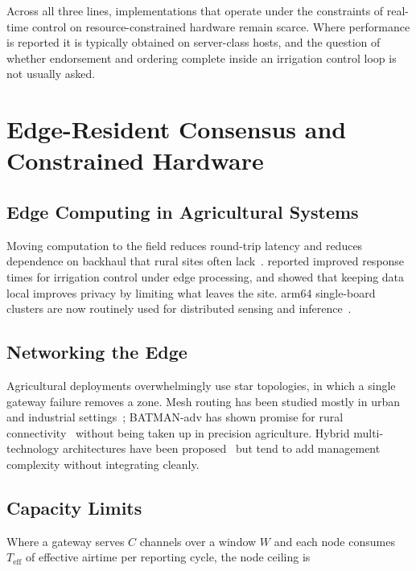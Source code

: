 \documentclass[12pt,a4paper,oneside]{book}
\begin{document}
Across all three lines, implementations that operate under the constraints of
real-time control on resource-constrained hardware remain scarce. Where
performance is reported it is typically obtained on server-class hosts, and the
question of whether endorsement and ordering complete inside an irrigation
control loop is not usually asked.

\section{Edge-Resident Consensus and Constrained Hardware}
\label{sec:lit_edge}

\subsection{Edge Computing in Agricultural Systems}

Moving computation to the field reduces round-trip latency and reduces
dependence on backhaul that rural sites often lack~\cite{sharma2020edge}.
\textcite{liu2019edge} reported improved response times for irrigation control
under edge processing, and \textcite{wang2021edge} showed that keeping data
local improves privacy by limiting what leaves the site. \gls{arm64}
single-board clusters are now routinely used for distributed sensing and
inference~\cite{sharma2020edge, wang2021edge}.

\subsection{Networking the Edge}

Agricultural deployments overwhelmingly use star topologies, in which a single
gateway failure removes a zone. Mesh routing has been studied mostly in urban
and industrial settings~\cite{akylidiz2005wireless}; BATMAN-adv has shown
promise for rural connectivity~\cite{schmidt2010b.a.t.m.a.n.} without being
taken up in precision agriculture. Hybrid multi-technology architectures have
been proposed~\cite{chettri2020comprehensive} but tend to add management
complexity without integrating cleanly.

\subsection{Capacity Limits}

Where a gateway serves $C$ channels over a window $W$ and each node consumes
$T_{\text{eff}}$ of effective airtime per reporting cycle, the node ceiling is
\end{document}
